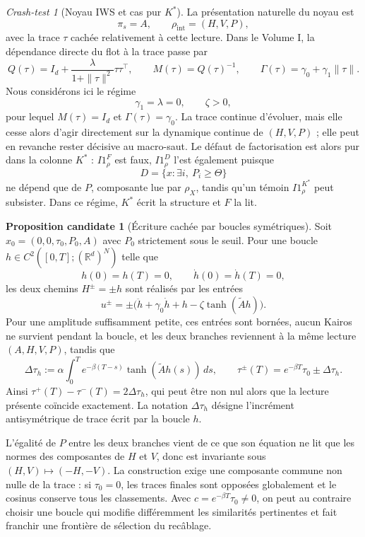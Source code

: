 \documentclass[11pt,a4paper]{article}
\theoremstyle{definition}
\newtheorem{proposition}[definition]{Proposition candidate}
\theoremstyle{remark}
\newtheorem{crashtest}[definition]{Crash-test}
\begin{document}
\begin{crashtest}[Noyau IWS et cas pur $K^*$]
La présentation naturelle du noyau est
\[
\pi_s=A,
\qquad
\rho_{\mathrm{int}}=(H,V,P),
\]
avec la trace $\tau$ cachée relativement à cette lecture. Dans le Volume I, la dépendance directe du flot à la trace passe par
\[
Q(\tau)=I_d+\frac{\lambda}{1+\|\tau\|^2}\tau\tau^\top,
\qquad M(\tau)=Q(\tau)^{-1},
\qquad \Gamma(\tau)=\gamma_0+\gamma_1\|\tau\|.
\]
Nous considérons ici le régime
\[
\gamma_1=\lambda=0,
\qquad
\zeta>0,
\]
pour lequel $M(\tau)=I_d$ et $\Gamma(\tau)=\gamma_0$. La trace continue d'évoluer, mais elle cesse alors d'agir directement sur la dynamique continue de $(H,V,P)$ ; elle peut en revanche rester décisive au macro-saut. Le défaut de factorisation est alors pur dans la colonne $K^*$ : $I1_\rho^F$ est faux, $I1_\rho^D$ l'est également puisque
\[
D=\{x:\exists i,\ P_i\geq\Theta\}
\]
ne dépend que de $P$, composante lue par $\rho_X$, tandis qu'un témoin $I1_\rho^{K^*}$ peut subsister. Dans ce régime, $K^*$ écrit la structure et $F$ la lit.

\begin{proposition}[Écriture cachée par boucles symétriques]
Soit $x_0=(0,0,\tau_0,P_0,A)$ avec $P_0$ strictement sous le seuil. Pour une boucle $h\in C^2([0,T];(\mathbb R^d)^N)$ telle que
\[
h(0)=h(T)=0,
\qquad
\dot h(0)=\dot h(T)=0,
\]
les deux chemins $H^\pm=\pm h$ sont réalisés par les entrées
\[
u^\pm=\pm\bigl(\ddot h+\gamma_0\dot h+h-\zeta\tanh(\widetilde Ah)\bigr).
\]
Pour une amplitude suffisamment petite, ces entrées sont bornées, aucun Kairos ne survient pendant la boucle, et les deux branches reviennent à la même lecture $(A,H,V,P)$, tandis que
\[
\Delta\tau_h
:=
\alpha\int_0^T e^{-\beta(T-s)}\tanh(\widetilde Ah(s))\,ds,
\qquad
\tau^\pm(T)=e^{-\beta T}\tau_0\pm\Delta\tau_h.
\]
Ainsi $\tau^+(T)-\tau^-(T)=2\Delta\tau_h$, qui peut être non nul alors que la lecture présente coïncide exactement. La notation $\Delta\tau_h$ désigne l'incrément antisymétrique de trace écrit par la boucle $h$.
\end{proposition}

L'égalité de $P$ entre les deux branches vient de ce que son équation ne lit que les normes des composantes de $H$ et $V$, donc est invariante sous $(H,V)\mapsto(-H,-V)$. La construction exige une composante commune non nulle de la trace : si $\tau_0=0$, les traces finales sont opposées globalement et le cosinus conserve tous les classements. Avec $c=e^{-\beta T}\tau_0\neq0$, on peut au contraire choisir une boucle qui modifie différemment les similarités pertinentes et fait franchir une frontière de sélection du recâblage.


\end{crashtest}
\end{document}
